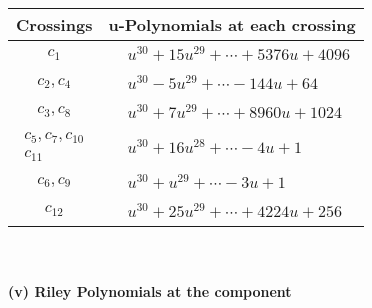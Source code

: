 \documentclass[1p]{elsarticle_modified}
\theoremstyle{definition}
\begin{document}
\begin{tabular}{m{50pt}|m{274pt}}
Crossings & \hspace{64pt}u-Polynomials at each crossing \\
\hline $$\begin{aligned}c_{1}\end{aligned}$$&$\begin{aligned}
&u^{30}+15 u^{29}+\cdots+5376 u+4096
\end{aligned}$\\
\hline $$\begin{aligned}c_{2},c_{4}\end{aligned}$$&$\begin{aligned}
&u^{30}-5 u^{29}+\cdots-144 u+64
\end{aligned}$\\
\hline $$\begin{aligned}c_{3},c_{8}\end{aligned}$$&$\begin{aligned}
&u^{30}+7 u^{29}+\cdots+8960 u+1024
\end{aligned}$\\
\hline $$\begin{aligned}c_{5},c_{7},c_{10}\\c_{11}\end{aligned}$$&$\begin{aligned}
&u^{30}+16 u^{28}+\cdots-4 u+1
\end{aligned}$\\
\hline $$\begin{aligned}c_{6},c_{9}\end{aligned}$$&$\begin{aligned}
&u^{30}+u^{29}+\cdots-3 u+1
\end{aligned}$\\
\hline $$\begin{aligned}c_{12}\end{aligned}$$&$\begin{aligned}
&u^{30}+25 u^{29}+\cdots+4224 u+256
\end{aligned}$\\
\hline
\end{tabular}\\~\\
\newpage\renewcommand{\arraystretch}{1}
\flushleft \textbf{(v) Riley Polynomials at the component}\newline \\
\end{document}

